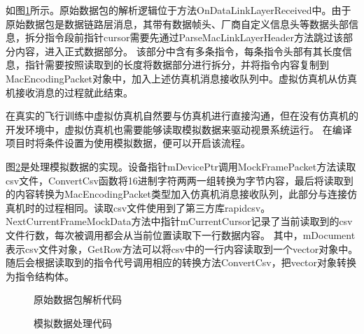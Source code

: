 \par
如图\ref{code5}所示。原始数据包的解析逻辑位于方法OnDataLinkLayerReceived中。由于原始数据包是数据链路层消息，其带有数据帧头、厂商自定义信息头等数据头部信息，拆分指令段前指针cursor需要先通过ParseMacLinkLayerHeader方法跳过该部分内容，进入正式数据部分。
该部分中含有多条指令，每条指令头部有其长度信息，指针需要按照读取到的长度将数据部分进行拆分，并将指令内容复制到MacEncodingPacket对象中，加入上述仿真机消息接收队列中。虚拟仿真机从仿真机接收消息的过程就此结束。
\par
在真实的飞行训练中虚拟仿真机自然要与仿真机进行直接沟通，但在没有仿真机的开发环境中，虚拟仿真机也需要能够读取模拟数据来驱动视景系统运行。
在编译项目时将条件设置为使用模拟数据，便可以开启该流程。
\par
图\ref{code6}是处理模拟数据的实现。设备指针mDevicePtr调用MockFramePacket方法读取csv文件，ConvertCsv函数将16进制字符两两一组转换为字节内容，最后将读取到的内容转换为MacEncodingPacket类型加入仿真机消息接收队列，此部分与连接仿真机时的过程相同。读取csv文件使用到了第三方库rapidcsv。
NextCurrentFrameMockData方法中指针mCurrentCursor记录了当前读取到的csv文件行数，每次被调用都会从当前位置读取下一行数据内容。
其中，mDocument表示csv文件对象，GetRow方法可以将csv中的一行内容读取到一个vector对象中。随后会根据读取到的指令代号调用相应的转换方法ConvertCsv，把vector对象转换为指令结构体。
\begin{figure}[h!]
    \centering
     
    \caption{原始数据包解析代码}
    \label{code5}
\end{figure}
\begin{figure}[h!]
    \centering
     
    \caption{模拟数据处理代码}
    \label{code6}
\end{figure}

